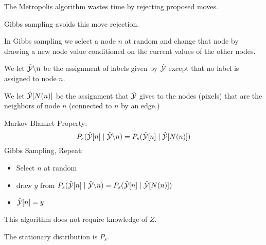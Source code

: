 {

The Metropolis algorithm wastes time by rejecting proposed moves.

\vfill
Gibbs sampling avoids this move rejection.

\vfill
In Gibbs sampling we select a node $n$ at random and change that node by drawing a new node value conditioned on the current values of the other nodes.

\vfill
We let {\color{red} $\hat{\cal Y} \backslash n$} be the assignment of labels given by $\hat{\cal Y}$ except that no label is assigned to node $n$.

\vfill
We let {\color{red} $\hat{\cal Y}[N(n)]$} be the assignment that $\hat{\cal Y}$ gives to the nodes (pixels) that are the neighbors of node $n$ (connected to $n$ by an edge.)


Markov Blanket Property:
{\color{red} $$P_s(\hat{\cal Y}[n] \;|\;\hat{\cal Y} \backslash n) = P_s(\hat{\cal Y}[n] \;|\; \hat{\cal Y}[N(n)])$$}
\vfill
Gibbs Sampling, Repeat:

\begin{itemize}
\item   Select $n$ at random

\item {\color{red} draw $y$ from $P_s(\hat{\cal Y}[n]\;|\;\hat{\cal Y} \backslash n) = P_s(\hat{\cal Y}[n] \;|\;\hat{\cal Y}[N(n)])$}

\item $\hat{\cal Y}[n] = y$
\end{itemize}

\vfill
This algorithm does not require knowledge of $Z$.

\vfill
The stationary distribution is $P_s$.


}


